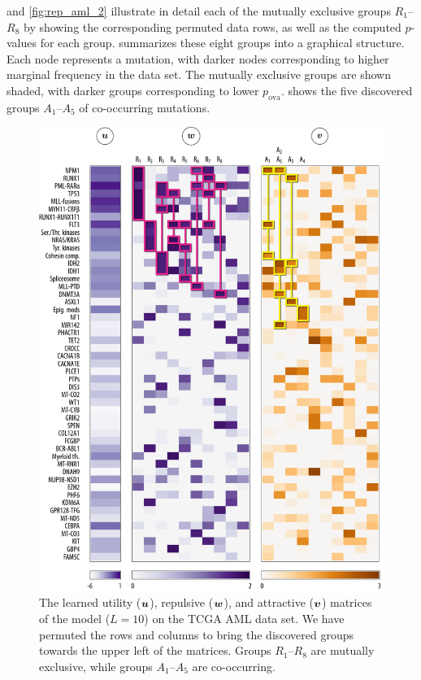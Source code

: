  and \ref{fig:rep_aml_2} illustrate in detail each of the mutually exclusive groups $R_1$--$R_8$ by showing the corresponding permuted data rows, as well as the computed $p$-values for each group.
 summarizes these eight groups into a graphical structure.
Each node represents a mutation, with darker nodes corresponding to higher marginal frequency in the data set.
The mutually exclusive groups are shown shaded, with darker groups corresponding to lower $p_{\mathrm{ova}}$.
 shows the five discovered groups $A_1$--$A_5$ of co-occurring mutations.

\begin{figure}[htbp]
\centering
\includegraphics[width=\textwidth]{figures/genes/mat_aml.pdf}
\caption{The learned utility ($\bm{u}$), repulsive ($\bm{w}$), and attractive ($\bm{v}$) matrices of the \fldc{} model ($L = 10$) on the TCGA AML data set.
We have permuted the rows and columns to bring the discovered groups towards the upper left of the matrices.
Groups $R_1$--$R_8$ are mutually exclusive, while groups $A_1$--$A_5$ are co-occurring.
}
\label{fig:mat_aml}
\end{figure}

